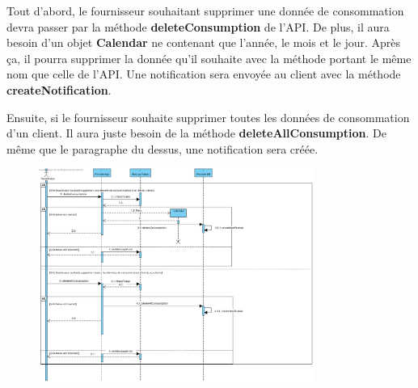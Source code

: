 \begin{flushleft}
Tout d'abord, le fournisseur souhaitant supprimer une donnée de consommation devra passer par la méthode \textbf{deleteConsumption} de l'API. De plus, il aura besoin d'un objet \textbf{Calendar} ne contenant que l'année, le mois et le jour. Après ça, il pourra supprimer la donnée qu'il souhaite avec la méthode portant le même nom que celle de l'API. Une notification sera envoyée au client avec la méthode \textbf{createNotification}.
\end{flushleft}

\begin{flushleft}
Ensuite, si le fournisseur souhaite supprimer toutes les données de consommation d'un client. Il aura juste besoin de la méthode \textbf{deleteAllConsumption}. De même que le paragraphe du dessus, une notification sera créée.
\end{flushleft}

\begin{figure}[h]
    \centering
    \includegraphics[width = 0.8\textwidth]{Base/sequence/img/fournisseur/gestion de la consommation.png}
\end{figure}
